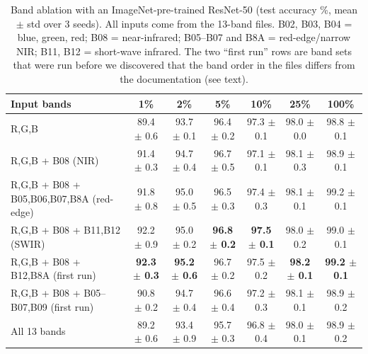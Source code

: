 \begin{table}[t]
\centering
\small
\setlength{\tabcolsep}{4pt}
\begin{tabular}{|l|c|c|c|c|c|c|}
\hline
Input bands & 1\% & 2\% & 5\% & 10\% & 25\% & 100\% \\ \hline \hline
R,G,B & 89.4 $\pm$ 0.6 & 93.7 $\pm$ 0.1 & 96.4 $\pm$ 0.2 & 97.3 $\pm$ 0.1 & 98.0 $\pm$ 0.0 & 98.8 $\pm$ 0.1 \\
R,G,B + B08 (NIR) & 91.4 $\pm$ 0.3 & 94.7 $\pm$ 0.4 & 96.7 $\pm$ 0.5 & 97.1 $\pm$ 0.1 & 98.1 $\pm$ 0.3 & 98.9 $\pm$ 0.1 \\
R,G,B + B08 + B05,B06,B07,B8A (red-edge) & 91.8 $\pm$ 0.8 & 95.0 $\pm$ 0.5 & 96.5 $\pm$ 0.3 & 97.4 $\pm$ 0.3 & 98.1 $\pm$ 0.1 & 99.2 $\pm$ 0.1 \\
R,G,B + B08 + B11,B12 (SWIR) & 92.2 $\pm$ 0.9 & 95.0 $\pm$ 0.2 & \textbf{96.8 $\pm$ 0.2} & \textbf{97.5 $\pm$ 0.1} & 98.0 $\pm$ 0.2 & 99.0 $\pm$ 0.1 \\
R,G,B + B08 + B12,B8A (first run) & \textbf{92.3 $\pm$ 0.3} & \textbf{95.2 $\pm$ 0.6} & 96.7 $\pm$ 0.2 & 97.5 $\pm$ 0.2 & \textbf{98.2 $\pm$ 0.1} & \textbf{99.2 $\pm$ 0.1} \\
R,G,B + B08 + B05--B07,B09 (first run) & 90.8 $\pm$ 0.2 & 94.7 $\pm$ 0.4 & 96.6 $\pm$ 0.4 & 97.2 $\pm$ 0.3 & 98.1 $\pm$ 0.1 & 98.9 $\pm$ 0.2 \\
All 13 bands & 89.2 $\pm$ 0.6 & 93.4 $\pm$ 0.9 & 95.7 $\pm$ 0.3 & 96.8 $\pm$ 0.4 & 98.0 $\pm$ 0.1 & 98.9 $\pm$ 0.2 \\
\hline
\end{tabular}
\caption{Band ablation with an ImageNet-pre-trained ResNet-50 (test accuracy \%, mean $\pm$ std over 3 seeds). All inputs come from the 13-band files. B02, B03, B04 = blue, green, red; B08 = near-infrared; B05--B07 and B8A = red-edge/narrow NIR; B11, B12 = short-wave infrared. The two ``first run'' rows are band sets that were run before we discovered that the band order in the files differs from the documentation (see text).}
\label{tab:bands}
\end{table}